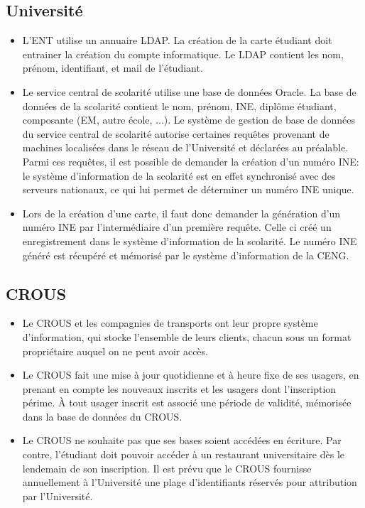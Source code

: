 \documentclass[12pt]{article}
\begin{document}
\subsection{Université}
\begin{itemize}
\item 
L'ENT utilise un annuaire LDAP.
La création de la carte étudiant doit entrainer la création du compte informatique.
Le LDAP contient les nom, prénom, identifiant, et mail de l'étudiant.


\item
Le service central de scolarité utilise une base de données Oracle.
La base de données de la scolarité contient le nom, prénom, INE, 
diplôme étudiant,  composante (EM, autre école, ...).
Le système de gestion de base de données du service central de scolarité autorise
certaines requêtes provenant de machines localisées dans le réseau de 
l'Université et déclarées au préalable.
Parmi ces requêtes, il est possible de demander la création d'un numéro INE:
le système d'information de la scolarité est en effet synchronisé avec des 
serveurs nationaux, ce qui lui permet de déterminer un numéro INE unique.

\item 
Lors de la création d'une carte, il faut donc demander la génération
d'un numéro INE par l'intermédiaire d'un première requête. Celle
ci créé un enregistrement dans le système d'information de la scolarité.
Le numéro INE généré est récupéré et mémorisé par le système d'information de la
CENG.


\end{itemize}

\subsection{CROUS}
\begin{itemize}
\item 
Le CROUS et les compagnies de transports ont leur propre système d'information, qui stocke l'ensemble
de leurs clients, chacun sous un format propriétaire auquel on ne peut avoir accès.

\item
Le CROUS fait une mise à jour quotidienne et à heure fixe de ses usagers, en prenant en compte
les nouveaux inscrits et les usagers dont l'inscription périme.
À tout usager inscrit est associé une période de validité, mémorisée dans la base de données du CROUS.

\item
Le CROUS ne souhaite pas que ses bases soient accédées en écriture.
Par contre, l'étudiant doit pouvoir accéder à un restaurant universitaire dès le lendemain de son inscription.
Il est prévu que le CROUS fournisse annuellement à l'Université une plage d'identifiants réservés pour attribution
par l'Université.
\end{itemize}
\end{document}
